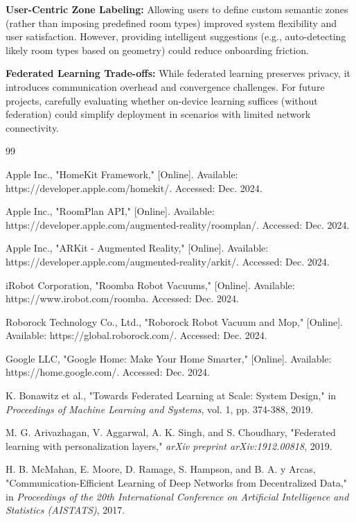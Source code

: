 \documentclass[conference]{IEEEtran}
\begin{document}
\textbf{User-Centric Zone Labeling:} Allowing users to define custom semantic zones (rather than imposing predefined room types) improved system flexibility and user satisfaction. However, providing intelligent suggestions (e.g., auto-detecting likely room types based on geometry) could reduce onboarding friction.

\textbf{Federated Learning Trade-offs:} While federated learning preserves privacy, it introduces communication overhead and convergence challenges. For future projects, carefully evaluating whether on-device learning suffices (without federation) could simplify deployment in scenarios with limited network connectivity.

\begin{thebibliography}{99}

Apple Inc., "HomeKit Framework," [Online]. Available: https://developer.apple.com/homekit/. Accessed: Dec. 2024.

Apple Inc., "RoomPlan API," [Online]. Available: https://developer.apple.com/augmented-reality/roomplan/. Accessed: Dec. 2024.

Apple Inc., "ARKit - Augmented Reality," [Online]. Available: https://developer.apple.com/augmented-reality/arkit/. Accessed: Dec. 2024.

iRobot Corporation, "Roomba Robot Vacuums," [Online]. Available: https://www.irobot.com/roomba. Accessed: Dec. 2024.

Roborock Technology Co., Ltd., "Roborock Robot Vacuum and Mop," [Online]. Available: https://global.roborock.com/. Accessed: Dec. 2024.

Google LLC, "Google Home: Make Your Home Smarter," [Online]. Available: https://home.google.com/. Accessed: Dec. 2024.

K. Bonawitz et al., "Towards Federated Learning at Scale: System Design," in \textit{Proceedings of Machine Learning and Systems}, vol. 1, pp. 374-388, 2019.

M. G. Arivazhagan, V. Aggarwal, A. K. Singh, and S. Choudhary, "Federated learning with personalization layers," \textit{arXiv preprint arXiv:1912.00818}, 2019.

H. B. McMahan, E. Moore, D. Ramage, S. Hampson, and B. A. y Arcas, "Communication-Efficient Learning of Deep Networks from Decentralized Data," in \textit{Proceedings of the 20th International Conference on Artificial Intelligence and Statistics (AISTATS)}, 2017.


\end{thebibliography}
\end{document}

